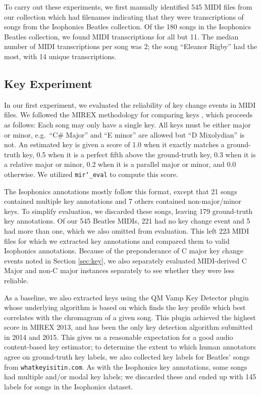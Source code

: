 \documentclass{article}
\begin{document}
To carry out these experiments, we first manually identified 545 MIDI files from our collection which had filenames indicating that they were transcriptions of songs from the Isophonics Beatles collection.
Of the 180 songs in the Isophonics Beatles collection, we found MIDI transcriptions for all but 11.
The median number of MIDI transcriptions per song was 2; the song ``Eleanor Rigby'' had the most, with 14 unique transcriptions.

\subsection{Key Experiment}

In our first experiment, we evaluated the reliability of key change events in MIDI files.
We followed the MIREX methodology for comparing keys \cite{ehmann2016mirex}, which proceeds as follows:
Each song may only have a single key.
All keys must be either major or minor, e.g.\ ``C\# Major'' and ``E minor'' are allowed but ``D Mixolydian'' is not.
An estimated key is given a score of 1.0 when it exactly matches a ground-truth key, 0.5 when it is a perfect fifth above the ground-truth key, 0.3 when it is a relative major or minor, 0.2 when it is a parallel major or minor, and 0.0 otherwise.
We utilized \texttt{mir\char`_eval} \cite{raffel2014mir_eval} to compute this score.

The Isophonics annotations mostly follow this format, except that 21 songs contained multiple key annotations and 7 others contained non-major/minor keys.
To simplify evaluation, we discarded these songs, leaving 179 ground-truth key annotations.
Of our 545 Beatles MIDIs, 221 had no key change event and 5 had more than one, which we also omitted from evaluation.
This left 223 MIDI files for which we extracted key annotations and compared them to valid Isophonics annotations.
Because of the preponderance of C major key change events noted in Section \ref{sec:key}, we also separately evaluated MIDI-derived C Major and non-C major instances separately to see whether they were less reliable.

As a baseline, we also extracted keys using the QM Vamp Key Detector plugin \cite{cannam2015mirex} whose underlying algorithm is based on \cite{noland2007signal} which finds the key profile which best correlates with the chromagram of a given song.
This plugin achieved the highest score in MIREX 2013, and has been the only key detection algorithm submitted in 2014 and 2015.
This gives us a reasonable expectation for a good audio content-based key estimator; to determine the extent to which human annotators agree on ground-truth key labels, we also collected key labels for Beatles' songs from \texttt{whatkeyisitin.com}.
As with the Isophonics key annotations, some songs had multiple and/or modal key labels; we discarded these and ended up with 145 labels for songs in the Isophonics dataset.
\end{document}
